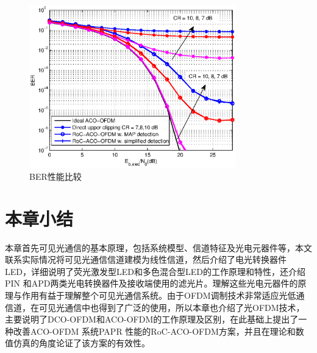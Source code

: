 \begin{figure}[htbp]
    \centering
    \includegraphics[width=0.8\textwidth]{figures/chapter-2/BER_1.eps}
    \caption{BER性能比较}
    \label{fig:BER_1}
\end{figure}
\section{本章小结}
本章首先可见光通信的基本原理，包括系统模型、信道特征及光电元器件等，本文联系实际情况将可见光通信信道建模为线性信道，然后介绍了电光转换器件LED，详细说明了荧光激发型LED和多色混合型LED的工作原理和特性，还介绍PIN 和APD两类光电转换器件及接收端使用的滤光片。理解这些光电元器件的原理与作用有益于理解整个可见光通信系统。由于OFDM调制技术非常适应光低通信道，在可见光通信中也得到了广泛的使用，所以本章也介绍了光OFDM技术，主要说明了DCO-OFDM和ACO-OFDM的工作原理及区别，在此基础上提出了一种改善ACO-OFDM 系统PAPR 性能的RoC-ACO-OFDM方案，并且在理论和数值仿真的角度论证了该方案的有效性。
